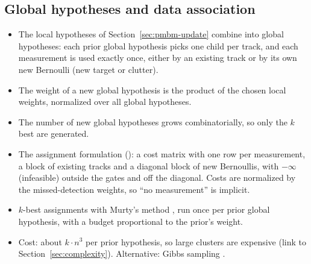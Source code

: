 \subsection{Global hypotheses and data association}
\label{sec:pmbm-da}
\begin{itemize}
    \item The local hypotheses of Section~\ref{sec:pmbm-update} combine into global hypotheses: each prior global hypothesis picks one child per track, and each measurement is used exactly once, either by an existing track or by its own new Bernoulli (new target or clutter).
    \item The weight of a new global hypothesis is the product of the chosen local weights, normalized over all global hypotheses.
    \item The number of new global hypotheses grows combinatorially, so only the $k$ best are generated.
    \item The assignment formulation (\cite{garcia_2018_pmbm}): a cost matrix with one row per measurement, a block of existing tracks and a diagonal block of new Bernoullis, with $-\infty$ (infeasible) outside the gates and off the diagonal. Costs are normalized by the missed-detection weights, so ``no measurement'' is implicit.
    \item $k$-best assignments with Murty's method \cite{Murty}, run once per prior global hypothesis, with a budget proportional to the prior's weight.
    \item Cost: about $k \cdot n^3$ per prior hypothesis, so large clusters are expensive (link to Section~\ref{sec:complexity}). Alternative: Gibbs sampling \cite{gibbs_glmb}.
\end{itemize}



